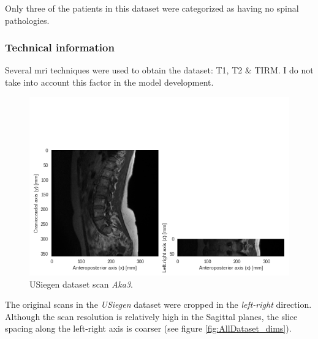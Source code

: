 Only three of the patients in this dataset were categorized as having no spinal pathologies.

\subsubsection{Technical information}

Several \acrlong{mri} techniques were used to obtain the dataset: T1, T2 \& TIRM.
I do not take into account this factor in the model development.

\begin{figure}
    \centering
    \includegraphics[width=.95\textwidth]{automated_graphs/USiegen_Aka3.png}
    \caption{USiegen dataset scan \textit{Aka3}. \label{fig:USiegen_Aka3}}
\end{figure}

The original scans in the \textit{USiegen} dataset were cropped in the \textit{left-right} direction. 
Although the scan resolution is relatively high in the Sagittal planes, the slice spacing along the left-right axis is coarser (see figure \ref{fig:AllDataset_dims}).  